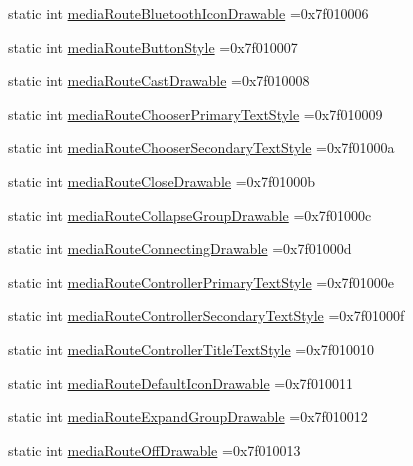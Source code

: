\begin{DoxyCompactItemize}
static int \hyperlink{classandroid_1_1support_1_1v4_1_1R_1_1attr_a7edac0f4a8fce3ba05eb1110b3842e12}{media\+Route\+Bluetooth\+Icon\+Drawable} =0x7f010006
\item 
static int \hyperlink{classandroid_1_1support_1_1v4_1_1R_1_1attr_aa431219497981e8dea0e2c656ef265e0}{media\+Route\+Button\+Style} =0x7f010007
\item 
static int \hyperlink{classandroid_1_1support_1_1v4_1_1R_1_1attr_a1baa7615b19696344c56706d077140f8}{media\+Route\+Cast\+Drawable} =0x7f010008
\item 
static int \hyperlink{classandroid_1_1support_1_1v4_1_1R_1_1attr_a4dff0d12665745adbe5491bb59529740}{media\+Route\+Chooser\+Primary\+Text\+Style} =0x7f010009
\item 
static int \hyperlink{classandroid_1_1support_1_1v4_1_1R_1_1attr_aacbff453bc889179388a1ce2e51a5169}{media\+Route\+Chooser\+Secondary\+Text\+Style} =0x7f01000a
\item 
static int \hyperlink{classandroid_1_1support_1_1v4_1_1R_1_1attr_a6019a93ba270689583c86bd27b047e92}{media\+Route\+Close\+Drawable} =0x7f01000b
\item 
static int \hyperlink{classandroid_1_1support_1_1v4_1_1R_1_1attr_a5b3d3bf38fc13be643d70cd6a68ca3c3}{media\+Route\+Collapse\+Group\+Drawable} =0x7f01000c
\item 
static int \hyperlink{classandroid_1_1support_1_1v4_1_1R_1_1attr_ae3f61fb1dc6d6390ef892df434fcbe97}{media\+Route\+Connecting\+Drawable} =0x7f01000d
\item 
static int \hyperlink{classandroid_1_1support_1_1v4_1_1R_1_1attr_aca99969b4c224dd397d933c4f89c3cb3}{media\+Route\+Controller\+Primary\+Text\+Style} =0x7f01000e
\item 
static int \hyperlink{classandroid_1_1support_1_1v4_1_1R_1_1attr_a2325c29e9eb062cd0edb2d63932bc3dd}{media\+Route\+Controller\+Secondary\+Text\+Style} =0x7f01000f
\item 
static int \hyperlink{classandroid_1_1support_1_1v4_1_1R_1_1attr_a4462c08ee703366213195af68be0f007}{media\+Route\+Controller\+Title\+Text\+Style} =0x7f010010
\item 
static int \hyperlink{classandroid_1_1support_1_1v4_1_1R_1_1attr_aecd38582480f3fa0715b0946cd73694e}{media\+Route\+Default\+Icon\+Drawable} =0x7f010011
\item 
static int \hyperlink{classandroid_1_1support_1_1v4_1_1R_1_1attr_a1393c7eb214b18dd5f72868ef6079c12}{media\+Route\+Expand\+Group\+Drawable} =0x7f010012
\item 
static int \hyperlink{classandroid_1_1support_1_1v4_1_1R_1_1attr_a2b4856f07bae527f95b5e6e044e7af36}{media\+Route\+Off\+Drawable} =0x7f010013

\end{DoxyCompactItemize}
